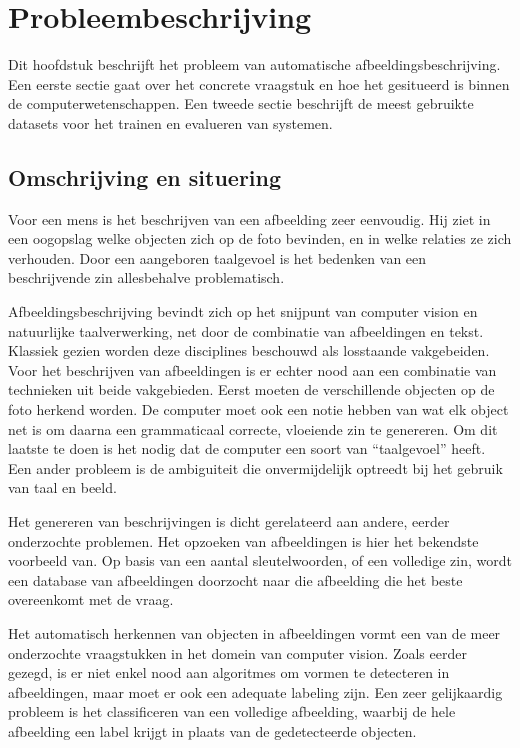 \chapter{Probleembeschrijving}
\label{chap:Probleembeschrijving}

Dit hoofdstuk beschrijft het probleem van automatische afbeeldingsbeschrijving. Een eerste sectie gaat over het concrete vraagstuk en hoe het gesitueerd is binnen de computerwetenschappen. Een tweede sectie beschrijft de meest gebruikte datasets voor het trainen en evalueren van systemen.

\section{Omschrijving en situering}
\label{sec:Omschrijving en situering}
Voor een mens is het beschrijven van een afbeelding zeer eenvoudig. Hij ziet in een oogopslag welke objecten zich op de foto bevinden, en in welke relaties ze zich verhouden. Door een aangeboren taalgevoel is het bedenken van een beschrijvende zin allesbehalve problematisch.

Afbeeldingsbeschrijving bevindt zich op het snijpunt van computer vision en natuurlijke taalverwerking, net door de combinatie van afbeeldingen en tekst. Klassiek gezien worden deze disciplines beschouwd als losstaande vakgebeiden. Voor het beschrijven van afbeeldingen is er echter nood aan een combinatie van technieken uit beide vakgebieden. Eerst moeten de verschillende objecten op de foto herkend worden. De computer moet ook een notie hebben van wat elk object net is om daarna een grammaticaal correcte, vloeiende zin te genereren. Om dit laatste te doen is het nodig dat de computer een soort van ``taalgevoel'' heeft. Een ander probleem is de ambiguiteit die onvermijdelijk optreedt bij het gebruik van taal en beeld.

Het genereren van beschrijvingen is dicht gerelateerd aan andere, eerder onderzochte problemen. Het opzoeken van afbeeldingen is hier het bekendste voorbeeld van. Op basis van een aantal sleutelwoorden, of een volledige zin, wordt een database van afbeeldingen doorzocht naar die afbeelding die het beste overeenkomt met de vraag.

Het automatisch herkennen van objecten in afbeeldingen vormt een van de meer onderzochte vraagstukken in het domein van computer vision. Zoals eerder gezegd, is er niet enkel nood aan algoritmes om vormen te detecteren in afbeeldingen, maar moet er ook een adequate labeling zijn. Een zeer gelijkaardig probleem is het classificeren van een volledige afbeelding, waarbij de hele afbeelding een label krijgt in plaats van de gedetecteerde objecten. 

